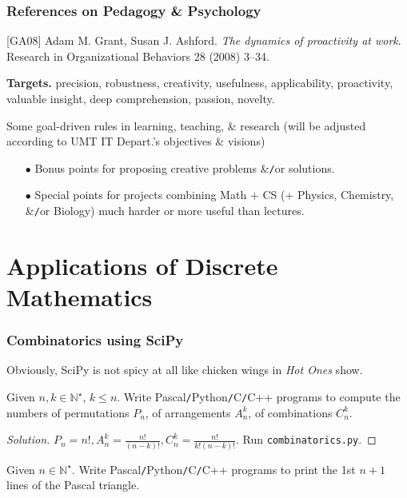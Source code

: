 \documentclass{beamer}
\begin{document}
\begin{frame}
	\frametitle{References on Pedagogy \& Psychology}
	[GA08] {\sc Adam M. Grant, Susan J. Ashford}. {\it The dynamics of proactivity at work}. Research in Organizational Behaviors 28 (2008) 3--34.
	\vspace{5mm}
	
	{\bf Targets.} precision, robustness, creativity, usefulness, applicability, proactivity, valuable insight, deep comprehension, passion, novelty.
	\begin{block}{Some goal-driven rules in learning, teaching, \& research}
		(will be adjusted according to UMT IT Depart.'s objectives \& visions)
		\begin{itemize}
			\item[$\bullet$] Bonus points for proposing creative problems \&{\tt/}or solutions.
			\item[$\bullet$] Special points for projects combining Math $+$ CS ($+$ Physics, Chemistry, \&{\tt/}or Biology) much harder or more useful than lectures.
		\end{itemize}
	\end{block}
\end{frame}

\section{Applications of Discrete Mathematics}

\begin{frame}
	\frametitle{Combinatorics using SciPy}
	Obviously, SciPy is not spicy at all like chicken wings in {\it Hot Ones} show.
	\begin{problem}
		Given $n,k\in\mathbb{N}^\star$, $k\le n$. Write {\sf Pascal{\tt/}Python{\tt/}C{\tt/}C++} programs to compute the numbers of permutations $P_n$, of arrangements $A_n^k$, of combinations $C_n^k$.
	\end{problem}
	
	\begin{proof}[Solution]
		$P_n = n!,A_n^k = \frac{n!}{(n - k)!},C_n^k = \frac{n!}{k!(n - k)!}$. Run {\tt combinatorics.py}.		
	\end{proof}
	
	\begin{problem}
		Given $n\in\mathbb{N}^\star$. Write {\sf Pascal{\tt/}Python{\tt/}C{\tt/}C++} programs to print the 1st $n + 1$ lines of the Pascal triangle.
	\end{problem}
\end{frame}
\end{document}
